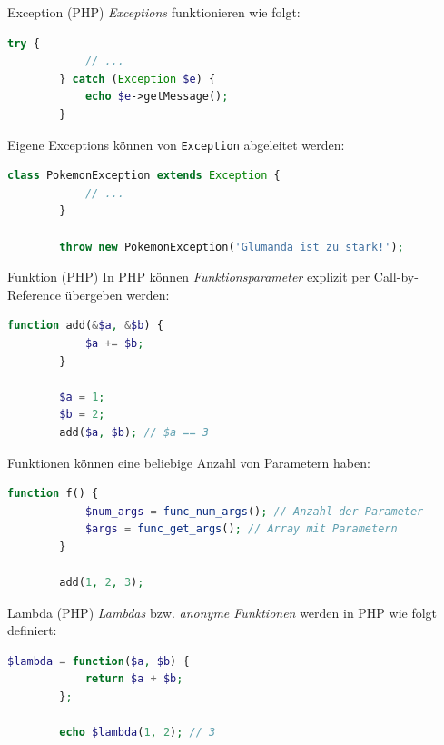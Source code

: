 \begin{defi}{Exception (PHP)}
    \emph{Exceptions} funktionieren wie folgt:

    \begin{lstlisting}[language=php]
        try {
            // ...
        } catch (Exception $e) {
            echo $e->getMessage();
        }
    \end{lstlisting}

    Eigene Exceptions können von \texttt{Exception} abgeleitet werden:

    \begin{lstlisting}[language=php]
        class PokemonException extends Exception {
            // ...
        }

        throw new PokemonException('Glumanda ist zu stark!');
    \end{lstlisting}
\end{defi}

\begin{defi}{Funktion (PHP)}
    In PHP können \emph{Funktionsparameter} explizit per Call-by-Reference übergeben werden:

    \begin{lstlisting}[language=php]
        function add(&$a, &$b) {
            $a += $b;
        }

        $a = 1;
        $b = 2;
        add($a, $b); // $a == 3
    \end{lstlisting}

    Funktionen können eine beliebige Anzahl von Parametern haben:


    \begin{lstlisting}[language=php]
        function f() {
            $num_args = func_num_args(); // Anzahl der Parameter
            $args = func_get_args(); // Array mit Parametern
        }

        add(1, 2, 3);
    \end{lstlisting}
\end{defi}

\begin{defi}{Lambda (PHP)}
    \emph{Lambdas} bzw. \emph{anonyme Funktionen} werden in PHP wie folgt definiert:

    \begin{lstlisting}[language=php]
        $lambda = function($a, $b) {
            return $a + $b;
        };

        echo $lambda(1, 2); // 3
    \end{lstlisting}
\end{defi}


